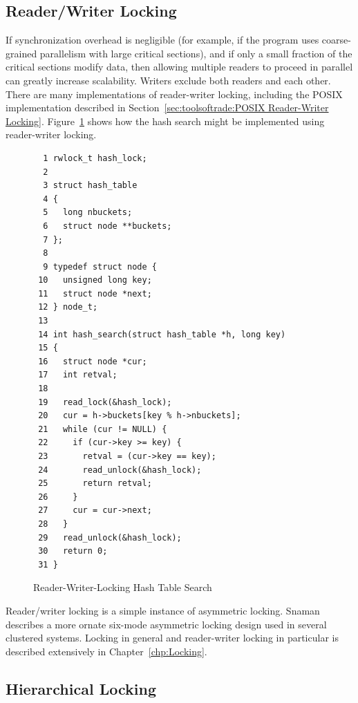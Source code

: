 \subsection{Reader/Writer Locking}
\label{sec:SMPdesign:Reader/Writer Locking}

If synchronization overhead is negligible (for example, if the program
uses coarse-grained parallelism with large critical sections), and if
only a small fraction of the critical sections modify data, then allowing
multiple readers to proceed in parallel can greatly increase scalability.
Writers exclude both readers and each other.
There are many implementations of reader-writer locking, including
the POSIX implementation described in
Section~\ref{sec:toolsoftrade:POSIX Reader-Writer Locking}.
Figure~\ref{fig:SMPdesign:Reader-Writer-Locking Hash Table Search}
shows how the hash search might be implemented using reader-writer locking.

\begin{figure}[htbp]
{ \scriptsize
\begin{verbatim}
  1 rwlock_t hash_lock;
  2
  3 struct hash_table
  4 {
  5   long nbuckets;
  6   struct node **buckets;
  7 };
  8
  9 typedef struct node {
 10   unsigned long key;
 11   struct node *next;
 12 } node_t;
 13
 14 int hash_search(struct hash_table *h, long key)
 15 {
 16   struct node *cur;
 17   int retval;
 18
 19   read_lock(&hash_lock);
 20   cur = h->buckets[key % h->nbuckets];
 21   while (cur != NULL) {
 22     if (cur->key >= key) {
 23       retval = (cur->key == key);
 24       read_unlock(&hash_lock);
 25       return retval;
 26     }
 27     cur = cur->next;
 28   }
 29   read_unlock(&hash_lock);
 30   return 0;
 31 }
\end{verbatim}
}
\caption{Reader-Writer-Locking Hash Table Search}
\label{fig:SMPdesign:Reader-Writer-Locking Hash Table Search}
\end{figure}

Reader/writer locking is a simple instance of asymmetric locking.
Snaman~\cite{Snaman87} describes a more ornate six-mode
asymmetric locking design used in several clustered systems.
Locking in general and reader-writer locking in particular is described
extensively in
Chapter~\ref{chp:Locking}.

\subsection{Hierarchical Locking}
\label{sec:SMPdesign:Hierarchical Locking}

